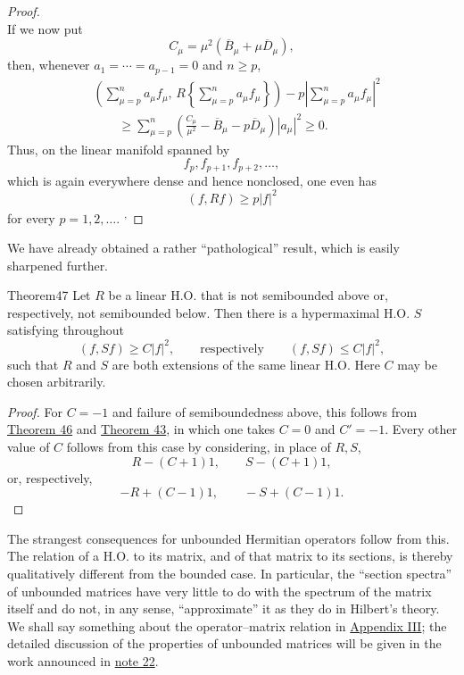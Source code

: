﻿\documentclass[paper=b5,fontsize=13pt,bookmarkpackage=false,twoside]{scrartcl}
\newcounter{translatornote}
\begin{document}
\begin{proof}
{\[\]
If we now put
\[
C_\mu=\mu^2(\overline B_\mu+\mu\overline D_\mu),
\]
then, whenever $a_1=\cdots=a_{p-1}=0$ and $n\ge p$,
\begin{align*}
&\left(\sum_{\mu=p}^{n}a_\mu f_\mu,\,
R\left\{\sum_{\mu=p}^{n}a_\mu f_\mu\right\}\right)
-p\left|\sum_{\mu=p}^{n}a_\mu f_\mu\right|^2\\
&\qquad\ge
\sum_{\mu=p}^{n}
\left(
\frac{C_\mu}{\mu^2}
-\overline B_\mu-p\overline D_\mu
\right)|a_\mu|^2
\ge0.
\end{align*}
Thus, on the linear manifold spanned by
\[
f_p,f_{p+1},f_{p+2},\ldots,
\]
which is again everywhere dense and hence nonclosed, one even has
\[
(f,Rf)\ge p|f|^2
\]
for every $p=1,2,\ldots$.}%
\textsuperscript{,}
\end{proof}

We have already obtained a rather ``pathological'' result, which is easily sharpened further.

\begin{namedstatement}{Theorem}{47}\label{thm:47}
Let $R$ be a linear H.O. that is not semibounded above or, respectively, not semibounded below. Then there is a hypermaximal H.O. $S$ satisfying throughout
\[
(f,Sf)\ge C|f|^2,
\qquad\text{respectively}\qquad
(f,Sf)\le C|f|^2,
\]
such that $R$ and $S$ are both extensions of the same linear H.O. Here $C$ may be chosen arbitrarily.
\end{namedstatement}

\begin{proof}
For $C=-1$ and failure of semiboundedness above, this follows from \hyperref[thm:46]{Theorem 46} and \hyperref[thm:43]{Theorem 43}, in which one takes $C=0$ and $C'=-1$. Every other value of $C$ follows from this case by considering, in place of $R,S$,
\[
R-(C+1)1,\qquad S-(C+1)1,
\]
or, respectively,
\[
-R+(C-1)1,\qquad -S+(C-1)1.
\]
\end{proof}

The strangest consequences for unbounded Hermitian operators follow from this. The relation of a H.O. to its matrix, and of that matrix to its sections, is thereby qualitatively different from the bounded case. In particular, the ``section spectra'' of unbounded matrices have very little to do with the spectrum of the matrix itself and do not, in any sense, ``approximate'' it as they do in Hilbert's theory. We shall say something about the operator--matrix relation in \hyperref[app:III]{Appendix III}; the detailed discussion of the properties of unbounded matrices will be given in the work announced in \hyperref[fn:source-22]{note 22}.
\end{document}
